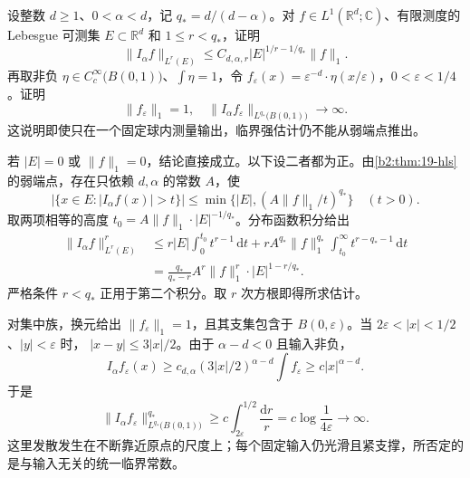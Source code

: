 \BookExercises

\begin{exercise}\label{b2:ex:19-new-1}
设整数 \(d\geq1\)、\(0<\alpha<d\)，记 \(q_*=d/(d-\alpha)\)。对 \(f\in L^1(\mathbb R^d;\mathbb C)\)、有限测度的 Lebesgue 可测集 \(E\subset\mathbb R^d\) 和 \(1\leq r<q_*\)，证明
\[
 \|I_\alpha f\|_{L^r(E)}
 \leq C_{d,\alpha,r}|E|^{1/r-1/q_*}\|f\|_1.
\]
再取非负 \(\eta\in C_c^\infty\bigl(B(0,1)\bigr)\)、\(\int\eta=1\)，令
\(f_\varepsilon(x)=\varepsilon^{-d}\cdot\eta(x/\varepsilon)\)，\(0<\varepsilon<1/4\)。证明
\[
 \|f_\varepsilon\|_1=1,
 \quad
 \|I_\alpha f_\varepsilon\|_{L^{q_*}\bigl(B(0,1)\bigr)}
       \longrightarrow\infty.
\]
这说明即使只在一个固定球内测量输出，临界强估计仍不能从弱端点推出。
\end{exercise}
\begin{solution}
若 \(|E|=0\) 或 \(\|f\|_1=0\)，结论直接成立。以下设二者都为正。由\cref{b2:thm:19-hls}的弱端点，存在只依赖 \(d,\alpha\) 的常数 \(A\)，使
\[
 \bigl|\{x\in E:|I_\alpha f(x)|>t\}\bigr|
 \leq\min\{|E|,(A\|f\|_1/t)^{q_*}\}
 \quad(t>0).
\]
取两项相等的高度 \(t_0=A\|f\|_1\cdot|E|^{-1/q_*}\)。分布函数积分给出
\[
 \begin{aligned}
 \|I_\alpha f\|_{L^r(E)}^r
 &\leq r|E|\int_0^{t_0}t^{r-1}\,\mathrm dt
   +rA^{q_*}\|f\|_1^{q_*}
                  \int_{t_0}^\infty t^{r-q_*-1}\,\mathrm dt\\
 &=\frac{q_*}{q_*-r}A^r\|f\|_1^r\cdot|E|^{1-r/q_*}.
 \end{aligned}
\]
严格条件 \(r<q_*\) 正用于第二个积分。取 \(r\) 次方根即得所求估计。

对集中族，换元给出 \(\|f_\varepsilon\|_1=1\)，且其支集包含于 \(B(0,\varepsilon)\)。当 \(2\varepsilon<|x|<1/2\)、\(|y|<\varepsilon\) 时，
\(|x-y|\leq3|x|/2\)。由于 \(\alpha-d<0\) 且输入非负，
\[
 I_\alpha f_\varepsilon(x)
 \geq c_{d,\alpha}(3|x|/2)^{\alpha-d}
                  \int f_\varepsilon
 \geq c|x|^{\alpha-d}.
\]
于是
\[
 \|I_\alpha f_\varepsilon\|_{L^{q_*}\bigl(B(0,1)\bigr)}^{q_*}
 \geq c\int_{2\varepsilon}^{1/2}\frac{\mathrm dr}{r}
 =c\log\frac1{4\varepsilon}\longrightarrow\infty.
\]
这里发散发生在不断靠近原点的尺度上；每个固定输入仍光滑且紧支撑，所否定的是与输入无关的统一临界常数。
\end{solution}

